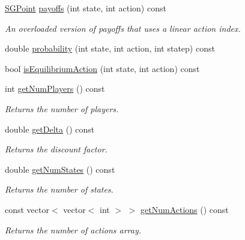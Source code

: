 \begin{DoxyCompactItemize}
\hyperlink{classSGPoint}{S\+G\+Point} \hyperlink{classSGAbstractGame_a0373c95c41562ed3ce95b3406961b1ee}{payoffs} (int state, int action) const
\begin{DoxyCompactList}\small\item\em An overloaded version of payoffs that uses a linear action index. \end{DoxyCompactList}\item 
double \hyperlink{classSGAbstractGame_a922ec5b744295bf7d367f4df20f65b9f}{probability} (int state, int action, int statep) const
\item 
bool \hyperlink{classSGAbstractGame_aa7b88a879bd7b7aa7e275c0e0e92a3d8}{is\+Equilibrium\+Action} (int state, int action) const
\item 
\mbox{\label{classSGAbstractGame_a16365eddd0af879c92ec17b47941fdee}} 
int \hyperlink{classSGAbstractGame_a16365eddd0af879c92ec17b47941fdee}{get\+Num\+Players} () const
\begin{DoxyCompactList}\small\item\em Returns the number of players. \end{DoxyCompactList}\item 
\mbox{\label{classSGAbstractGame_adadae7cc528721461df1ea217c8dbba0}} 
double \hyperlink{classSGAbstractGame_adadae7cc528721461df1ea217c8dbba0}{get\+Delta} () const
\begin{DoxyCompactList}\small\item\em Returns the discount factor. \end{DoxyCompactList}\item 
\mbox{\label{classSGAbstractGame_a02cf2b1cd5f86c44116bccc9dd17cdf7}} 
double \hyperlink{classSGAbstractGame_a02cf2b1cd5f86c44116bccc9dd17cdf7}{get\+Num\+States} () const
\begin{DoxyCompactList}\small\item\em Returns the number of states. \end{DoxyCompactList}\item 
\mbox{\label{classSGAbstractGame_a2ec57d2920b8f88a238899dd5e203f1a}} 
const vector$<$ vector$<$ int $>$ $>$ \hyperlink{classSGAbstractGame_a2ec57d2920b8f88a238899dd5e203f1a}{get\+Num\+Actions} () const
\begin{DoxyCompactList}\small\item\em Returns the number of actions array. \end{DoxyCompactList}\end{DoxyCompactItemize}
